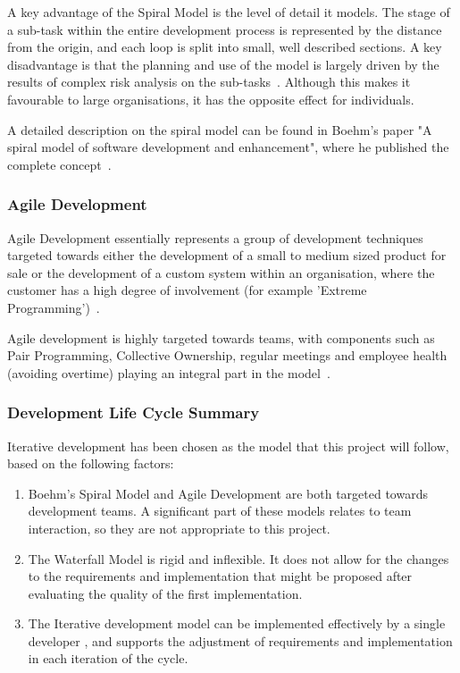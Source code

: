 \documentclass{article}
\begin{document}
A key advantage of the Spiral Model is the level of detail it models.  The stage of a sub-task within the entire development process is represented by the distance from the origin, and each loop is split into small, well described sections.  A key disadvantage is that the planning and use of the model is largely driven by the results of complex risk analysis on the sub-tasks~\cite{sommervilleSoftwareEngineering}.  Although this makes it favourable to large organisations, it has the opposite effect for individuals.

A detailed description on the spiral model can be found in Boehm's paper "A spiral model of software development and enhancement", where he published the complete concept~\cite{spiralModelSoftwareDevelopment}.

\subsubsection{Agile Development}
Agile Development essentially represents a group of development techniques targeted towards either the development of a small to medium sized product for sale or the development of a custom system within an organisation, where the customer has a high degree of involvement (for example 'Extreme Programming')~\cite{sommervilleSoftwareEngineering}.

Agile development is highly targeted towards teams, with components such as Pair Programming, Collective Ownership, regular meetings and employee health (avoiding overtime) playing an integral part in the model~\cite{sommervilleSoftwareEngineering}.

\subsubsection{Development Life Cycle Summary}
Iterative development has been chosen as the model that this project will follow, based on the following factors:
\begin{enumerate}
  \item Boehm's Spiral Model and Agile Development are both targeted towards development teams.  A significant part of these models relates to team interaction, so they are not appropriate to this project.
  \item The Waterfall Model is rigid and inflexible.  It does not allow for the changes to the requirements and implementation that might be proposed after evaluating the quality of the first implementation.
  \item The Iterative development model can be implemented effectively by a single developer , and supports the adjustment of requirements and implementation in each iteration of the cycle.
\end{enumerate}
\end{document}

